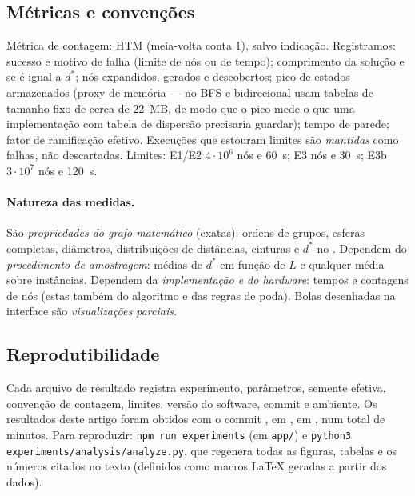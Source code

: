 \subsection{Métricas e convenções}
Métrica de contagem: HTM (meia-volta conta 1), salvo indicação. Registramos: sucesso e motivo de falha (limite de nós ou de tempo); comprimento da solução e se é igual a $d^*$; nós expandidos, gerados e descobertos; pico de estados armazenados (proxy de memória --- no  BFS e bidirecional usam tabelas de tamanho fixo de cerca de 22~MB, de modo que o pico mede o que uma implementação com tabela de dispersão precisaria guardar); tempo de parede; fator de ramificação efetivo. Execuções que estouram limites são \emph{mantidas} como falhas, não descartadas. Limites: E1/E2 $4\cdot10^6$ nós e 60~s; E3 \gclEthreeNodeLimit{} nós e 30~s; E3b $3\cdot10^7$ nós e 120~s.

\paragraph{Natureza das medidas.} São \emph{propriedades do grafo matemático} (exatas): ordens de grupos, esferas completas, diâmetros, distribuições de distâncias, cinturas e $d^*$ no . Dependem do \emph{procedimento de amostragem}: médias de $d^*$ em função de $L$ e qualquer média sobre instâncias. Dependem da \emph{implementação e do hardware}: tempos e contagens de nós (estas também do algoritmo e das regras de poda). Bolas desenhadas na interface são \emph{visualizações parciais}.

\subsection{Reprodutibilidade}
Cada arquivo de resultado registra experimento, parâmetros, semente efetiva, convenção de contagem, limites, versão do software, commit e ambiente. Os resultados deste artigo foram obtidos com o commit \texttt{\gclResultsCommit}, em \gclResultsEnv, em \gclResultsDate{}, num total de \gclResultsTotalMin{} minutos. Para reproduzir: \texttt{npm run experiments} (em \texttt{app/}) e \texttt{python3 experiments/analysis/analyze.py}, que regenera todas as figuras, tabelas e os números citados no texto (definidos como macros \LaTeX{} geradas a partir dos dados).
